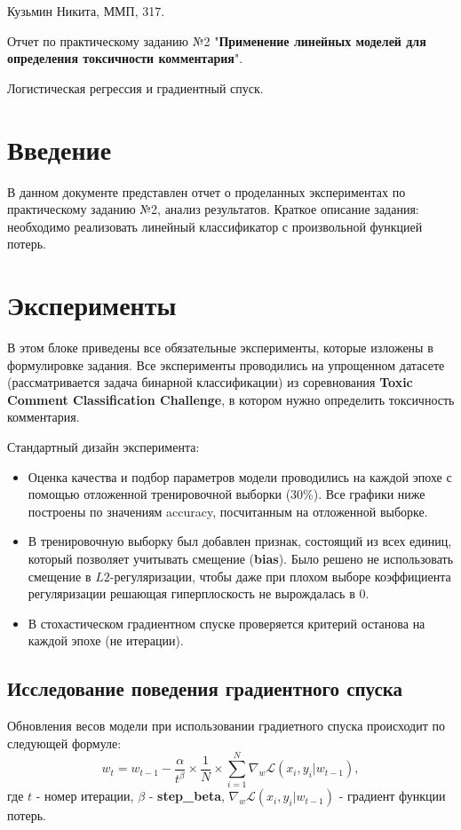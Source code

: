 \documentclass[a4paper, 11pt]{article}
\begin{document}
    \hfill Кузьмин Никита, ММП, 317.
    
    \begin{center} \Large Отчет по практическому заданию №2 "\textbf{Применение линейных моделей для определения токсичности комментария}". 
    
    Логистическая регрессия и градиентный спуск.
    \end{center}
    \tableofcontents
    \newpage
    \section{Введение}
    
    В данном документе представлен отчет о проделанных экспериментах по практическому заданию №2, анализ результатов. 
    Краткое описание задания: необходимо реализовать линейный классификатор с произвольной функцией потерь.
    
    \section{Эксперименты}
    В этом блоке приведены все обязательные эксперименты, которые изложены в формулировке задания.
    Все эксперименты проводились на упрощенном датасете (рассматривается задача бинарной классификации) из соревнования \textbf{Toxic Comment Classification Challenge}, в котором нужно определить токсичность комментария. 
    
    Стандартный дизайн эксперимента: 
    \begin{itemize}
        \item Оценка качества и подбор параметров модели проводились на каждой эпохе с помощью отложенной тренировочной выборки (30\%). Все графики ниже построены по значениям accuracy, посчитанным на отложенной выборке.
        \item В тренировочную выборку был добавлен признак, состоящий из всех единиц, который позволяет учитывать смещение (\textbf{bias}). Было решено не использовать смещение в $L2$-регуляризации, чтобы даже при плохом выборе коэффициента регуляризации решающая гиперплоскость не вырождалась в 0.
        \item В стохастическом градиентном спуске проверяется критерий останова на каждой эпохе (не итерации).
    \end{itemize}

        \subsection{Исследование поведения градиентного спуска}
            Обновления весов модели при использовании градиетного спуска происходит по следующей формуле:
            \begin{equation}\label{exp1:weight_upd}
            w_t = w_{t-1} - \frac{\alpha}{t^\beta} \times \frac{1}{N} \times \sum_{i=1}^{N}\nabla_{w}\mathcal{L}(x_i, y_i|w_{t-1}),
            \end{equation}
            где $t$ - номер итерации, $\beta$ - \textbf{step\_beta}, $\nabla_{w}\mathcal{L}(x_i, y_i|w_{t-1})$ - градиент функции потерь.
\end{document}
